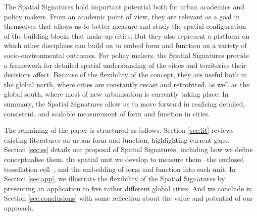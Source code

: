 The Spatial Signatures hold important potential both for urban academics and
policy makers. 
From an academic point of view, they are relevant as a goal in themselves
that allows us to better measure and study the spatial configuration of the
building blocks that make up cities. But they also represent a platform on
which other disciplines can build on to embed form and function on a variety
of socio-environmental outcomes.
For policy makers, the Spatial Signatures provide a framework for detailed
spatial understanding of the cities and territories their decisions affect.
Because of the flexibility of the concept, they are useful both in the global
north, where cities are constantly recast and retrofitted, as well as the
global south, where most of new urbanisation is currently taking place.
%
In summary, the Spatial Signatures allow us to move forward in realising
detailed, consistent, and scalable measurement of form and function in
cities.

The remaining of the paper is structured as follows. Section \ref{sec:lit}
reviews existing literatures on urban form and function, highlighting current
gaps. Section \ref{sec:ss} details our proposal of Spatial Signatures,
including how we define conceptualise them, the spatial unit we develop to
measure them --the enclosed tessellation cell--, and the embedding of form and
function into such unit. In Section \ref{sec:app}, we illustrate the
flexibility of the Spatial Signatures by presenting an application to five
rather different global cities. And we conclude in Section
\ref{sec:conclusions} with some reflection about the value and potential of
our approach.











